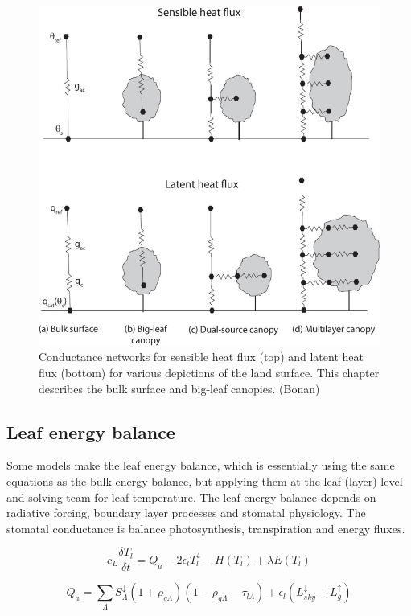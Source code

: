 \documentclass[
  12pt,
  oneside]{book}
\begin{document}
\begin{figure}

{\centering \includegraphics[width=0.8\linewidth]{figures/chap3/f330_E_balance} 

}

\caption{Conductance networks for sensible heat flux (top) and latent heat flux (bottom) for various depictions of the land surface. This chapter describes the bulk surface and big-leaf canopies. (Bonan)}\label{fig:f330}
\end{figure}

\hypertarget{leaf-energy-balance}{%
\subsection{Leaf energy balance}\label{leaf-energy-balance}}

Some models make the leaf energy balance, which is essentially using the same equations as the bulk energy balance, but applying them at the leaf (layer) level and solving team for leaf temperature. The leaf energy balance depends on radiative forcing, boundary layer processes and stomatal physiology. The stomatal conductance is balance photosynthesis, transpiration and energy fluxes.

\[
c_L \frac{\delta T_l}{\delta t} = Q_a - 2 \epsilon_l T_l^4 - H(T_l) + \lambda E(T_l)
\]

\[
Q_a = \sum_\Lambda S^{\downarrow}_\Lambda (1 + \rho_{g \Lambda})(1 - \rho_{g \Lambda} - \tau_{l \Lambda}) + \epsilon_l (L_{sky}^\downarrow+ L_g^{\uparrow})
\]
\end{document}
